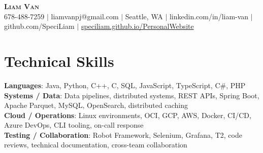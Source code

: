 \documentclass[letterpaper,11pt]{article}
\begin{document}

%
\begin{center}
    \textbf{\Huge \scshape Liam Van} \\ \vspace{1pt}
    \small 678-488-7259 $|$ \small {liamvanpj@gmail.com} $|$ Seattle, WA
 {{$|$ linkedin.com/in/liam-van} {$|$ github.com/SpeciLiam} {$|$ \href{https://speciliam.github.io/PersonalWebsite}{speciliam.github.io/PersonalWebsite}}}

\end{center}

\section{Technical Skills}
 \begin{itemize}[leftmargin=0.15in, label={}]
    \small{\item{
     \textbf{Languages}{: Java, Python, C++, C, SQL, JavaScript, TypeScript, C\#, PHP} \\
     \textbf{Systems / Data}{: Data pipelines, distributed systems, REST APIs, Spring Boot, Apache Parquet, MySQL, OpenSearch, distributed caching} \\
     \textbf{Cloud / Operations}{: Linux environments, OCI, GCP, AWS, Docker, CI/CD, Azure DevOps, CLI tooling, on-call response} \\
     \textbf{Testing / Collaboration}{: Robot Framework, Selenium, Grafana, T2, code reviews, technical documentation, cross-team collaboration} \\
    }}
 \end{itemize}
%
\end{document}
